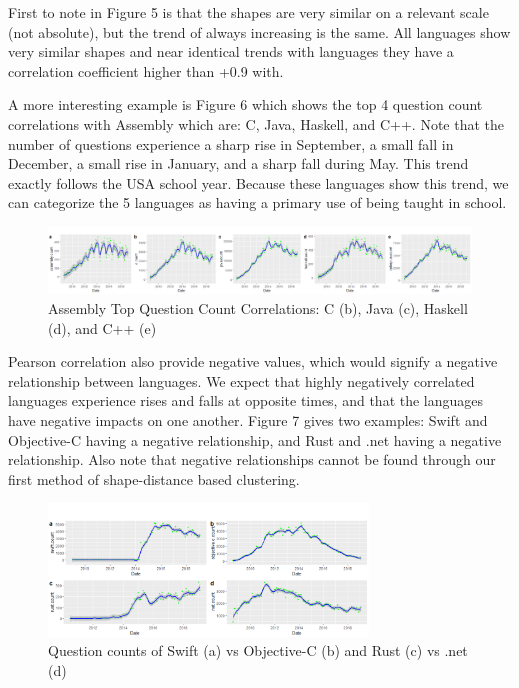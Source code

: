 \documentclass[conference]{IEEEtran}
\begin{document}
First to note in Figure 5 is that the shapes are very similar on a relevant scale (not absolute), but the trend of always increasing is the same. All languages show very similar shapes and near identical trends with languages they have a correlation coefficient higher than +0.9 with.

A more interesting example is Figure 6 which shows the top 4 question count correlations with Assembly which are: C, Java, Haskell, and C++. Note that the number of questions experience a sharp rise in September, a small fall in December, a small rise in January, and a sharp fall during May. This trend exactly follows the USA school year. Because these languages show this trend, we can categorize the 5 languages as having a primary use of being taught in school.

\begin{figure}[h]
\includegraphics[width=16cm]{schoolgroup.png}
\centering
\caption{Assembly Top Question Count Correlations: C (b), Java (c), Haskell (d), and C++ (e)}
\end{figure}

\vspace{5mm}

Pearson correlation also provide negative values, which would signify a negative relationship between languages. We expect that highly negatively correlated languages experience rises and falls at opposite times, and that the languages have negative impacts on one another. Figure 7 gives two examples: Swift and Objective-C having a negative relationship, and Rust and .net having a negative relationship. Also note that negative relationships cannot be found through our first method of shape-distance based clustering.

\begin{figure}[h]
\includegraphics[width=8.5cm]{counters.png}
\centering
\caption{Question counts of Swift (a) vs Objective-C (b) and Rust (c) vs .net (d)}
\end{figure}
\end{document}
